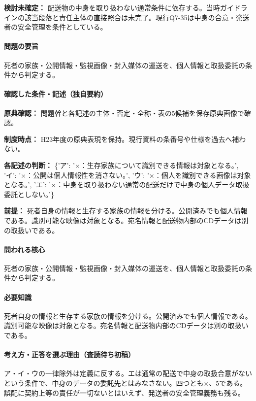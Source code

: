 \par\textbf{検討未確定：} 配送物の中身を取り扱わない通常条件に依存する。当時ガイドラインの該当段落と責任主体の直接照合は未完了。現行Q7-35は中身の合意・発送者の安全管理を条件としている。

\paragraph{問題の要旨} 死者の家族・公開情報・監視画像・封入媒体の運送を、個人情報と取扱委託の条件から判定する。

\paragraph{確認した条件・記述（独自要約）}\mbox{}\par

\noindent\textbf{原典確認：} 問題幹と各記述の主体・否定・全称・表の5候補を保存原典画像で確認。\par

\noindent\textbf{制度時点：} H23年度の原典表現を保持。現行資料の条番号や仕様を過去へ補わない。\par

\noindent\textbf{各記述の判断：} \{'ア': '×：生存家族について識別できる情報は対象となる。', 'イ': '×：公開は個人情報性を消さない。', 'ウ': '×：個人を識別できる画像は対象となる。', 'エ': '×：中身を取り扱わない通常の配送だけで中身の個人データ取扱委託としない。'\}\par

\noindent\textbf{前提：} 死者自身の情報と生存する家族の情報を分ける。公開済みでも個人情報である。識別可能な映像は対象となる。宛名情報と配送物内部のCDデータは別の取扱いである。\par

\paragraph{問われる核心} 死者の家族・公開情報・監視画像・封入媒体の運送を、個人情報と取扱委託の条件から判定する。

\paragraph{必要知識} 死者自身の情報と生存する家族の情報を分ける。公開済みでも個人情報である。識別可能な映像は対象となる。宛名情報と配送物内部のCDデータは別の取扱いである。

\paragraph{考え方・正答を選ぶ理由（査読待ち初稿）} ア・イ・ウの一律除外は定義に反する。エは通常の配送で中身の取扱合意がないという条件で、中身のデータの委託先とはみなさない。四つとも×、5である。誤配に契約上等の責任が一切ないとはいえず、発送者の安全管理義務も残る。

